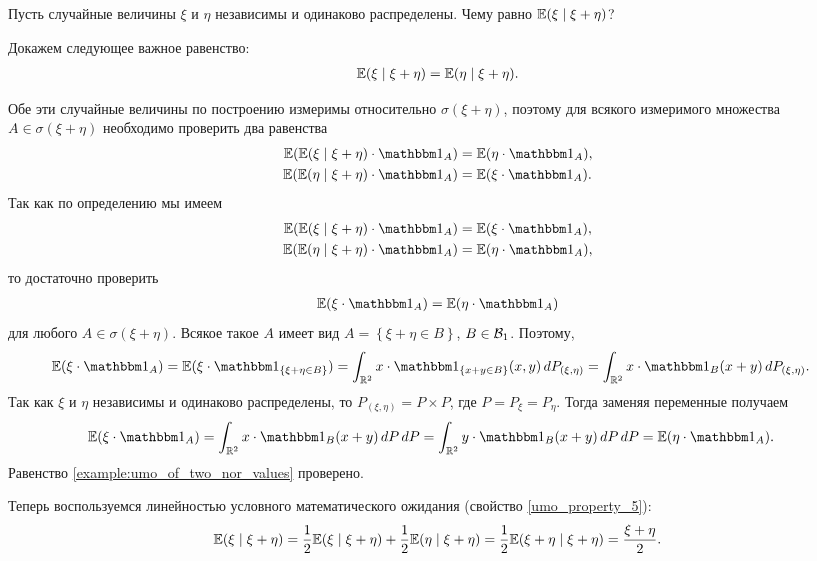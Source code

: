 \documentclass[../main.tex]{subfiles}
\begin{document}
\begin{exmpl}
 Пусть случайные величины $ \xi $ и $ \eta $ независимы и одинаково распределены. Чему равно $ \mathbb E(\xi \mid \xi + \eta) $?

 Докажем следующее важное равенство:
 \begin{align}
  \label{example:umo_of_two_nor_values}
  \mathbb E(\xi\mid\xi+\eta)=\mathbb E(\eta\mid\xi+\eta).
 \end{align}

 Обе эти случайные величины по построению измеримы относительно $ \sigma(\xi+\eta) $, поэтому для всякого измеримого множества $ A \in \sigma(\xi + \eta) $ необходимо проверить два равенства
 \begin{align*}
  \E(\E(\xi \mid \xi + \eta) \cdot \Ind_A) &= \E(\eta \cdot \Ind_A), \\
  \E(\E(\eta \mid \xi + \eta) \cdot \Ind_A) &= \E(\xi \cdot \Ind_A).
 \end{align*} Так как по определению мы имеем
 \begin{align*}
  \E(\E(\xi \mid \xi + \eta) \cdot \Ind_A) &= \E(\xi \cdot \Ind_A), \\
  \E(\E(\eta \mid \xi + \eta) \cdot \Ind_A) &= \E(\eta \cdot \Ind_A),
 \end{align*} то достаточно проверить
 \begin{align*}
  \E(\xi \cdot \Ind_A) = \E(\eta \cdot \Ind_A)
 \end{align*} для любого $ A \in \sigma(\xi + \eta) $. Всякое такое $ A $ имеет вид $ A = \left\{ \xi + \eta \in B \right\} $, $ B \in \mathcal B_1 $. Поэтому,
 \begin{align*}
  \E(\xi \cdot \Ind_A) &= \E(\xi \cdot \Ind_{\left\{ \xi+\eta \in B \right\}}) = \int_{\R^{2}} x \cdot \Ind_{\left\{ x + y \in B \right\}}(x, y)\,dP_{(\xi,\eta)} = \int_{\R^{2}} x \cdot \Ind_B(x + y)\,dP_{(\xi,\eta)}.
 \end{align*} Так как $ \xi $ и $ \eta $ независимы и одинаково распределены, то $ P_{(\xi,\eta)} = P \times P$, где $ P = P_\xi = P_\eta $. Тогда заменяя переменные получаем
 \begin{align*}
  \E(\xi \cdot \Ind_A) &= \int_{\R^{2}} x \cdot \Ind_B(x + y) \,dP \,dP = \int_{\R^{2}} y \cdot \Ind_B(x + y)  \,dP\,dP = \E(\eta \cdot \Ind_A).
 \end{align*} Равенство \eqref{example:umo_of_two_nor_values} проверено.

 Теперь воспользуемся линейностью условного математического ожидания (свойство \ref{umo_property_5}):
 \begin{align*}
  \mathbb E(\xi \mid\xi+\eta) = \frac{1}{2}\mathbb E(\xi\mid\xi+\eta) + \frac{1}{2}\mathbb E(\eta\mid\xi+\eta) = \frac{1}{2}\mathbb E(\xi + \eta \mid \xi + \eta) = \frac{\xi + \eta}{2}.
 \end{align*}
\end{exmpl}
\end{document}

